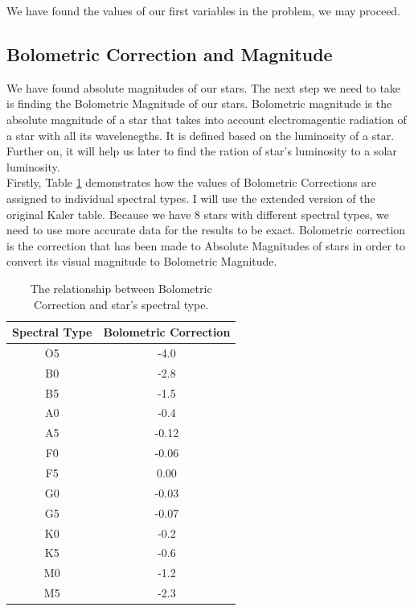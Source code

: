 \documentclass{article}
\begin{document}
We have found the values of our first variables in the problem, we may proceed.

\subsection{Bolometric Correction and Magnitude}
\label{bcm}
We have found absolute magnitudes of our stars. The next step we need to take is finding the Bolometric Magnitude of our stars. Bolometric magnitude is the absolute magnitude of a star that takes into account electromagentic radiation of a star with all its wavelenegths. It is defined based on the luminosity of a star. Further on, it will help us later to find the ration of star's luminosity to a solar luminosity.\\

Firstly, Table \ref{bc} demonstrates how the values of Bolometric Corrections are assigned to individual spectral types. I will use the extended version of the original Kaler table\cite{kaler}. Because we have 8 stars with different spectral types, we need to use more accurate data for the results to be exact. Bolometric correction is the correction that has been made to Absolute Magnitudes of stars in order to convert its visual magnitude to Bolometric Magnitude.\cite{bc}\\
  
  \begin{table}[h!]
    \begin{center}
      \centering
      \caption{The relationship between Bolometric Correction and star's spectral type.}
      \begin{tabular}{c | c}
        \textbf{Spectral Type} & \textbf{Bolometric Correction} \\
        \hline
        O5 & -4.0 \\
        B0 & -2.8 \\
        B5 & -1.5 \\
        A0 & -0.4 \\
        A5 & -0.12\\
        F0 & -0.06\\
        F5 & 0.00 \\
        G0 & -0.03\\
        G5 & -0.07\\
        K0 & -0.2 \\
        K5 & -0.6 \\
        M0 & -1.2 \\
        M5 & -2.3 \\
      \end{tabular}
      \label{bc}
    \end{center}
  \end{table}
\end{document}
